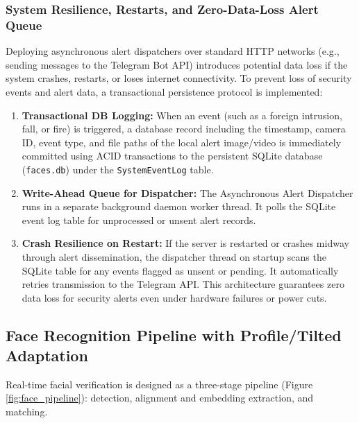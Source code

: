 \documentclass[12pt,a4paper]{article}
\begin{document}
\subsubsection{System Resilience, Restarts, and Zero-Data-Loss Alert Queue}
Deploying asynchronous alert dispatchers over standard HTTP networks (e.g., sending messages to the Telegram Bot API) introduces potential data loss if the system crashes, restarts, or loses internet connectivity. To prevent loss of security events and alert data, a transactional persistence protocol is implemented:
\begin{enumerate}
    \item \textbf{Transactional DB Logging:} When an event (such as a foreign intrusion, fall, or fire) is triggered, a database record including the timestamp, camera ID, event type, and file paths of the local alert image/video is immediately committed using ACID transactions to the persistent SQLite database (\texttt{faces.db}) under the \texttt{SystemEventLog} table.
    \item \textbf{Write-Ahead Queue for Dispatcher:} The Asynchronous Alert Dispatcher runs in a separate background daemon worker thread. It polls the SQLite event log table for unprocessed or unsent alert records.
    \item \textbf{Crash Resilience on Restart:} If the server is restarted or crashes midway through alert dissemination, the dispatcher thread on startup scans the SQLite table for any events flagged as unsent or pending. It automatically retries transmission to the Telegram API. This architecture guarantees zero data loss for security alerts even under hardware failures or power cuts.
\end{enumerate}


\subsection{Face Recognition Pipeline with Profile/Tilted Adaptation}
Real-time facial verification is designed as a three-stage pipeline (Figure \ref{fig:face_pipeline}): detection, alignment and embedding extraction, and matching.
\end{document}
